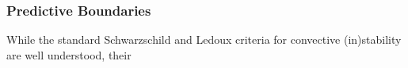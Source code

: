 {\color{brown}
\subsubsection{Predictive Boundaries}

While the standard Schwarzschild and Ledoux criteria for convective (in)stability are well understood, their

}
